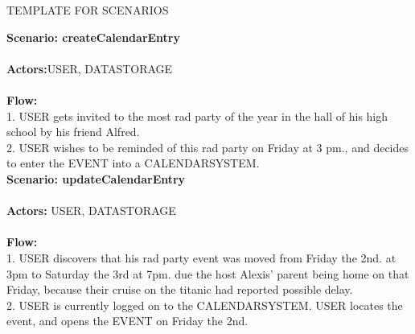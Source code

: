 TEMPLATE FOR SCENARIOS

\textbf{Scenario: createCalendarEntry}\\
\HRule \\[0.4cm]
\textbf{Actors:}USER, DATASTORAGE\\
\HRule \\[0.4cm]
\textbf{Flow:} \\
1. USER gets invited to the most rad party of the year in the hall of his high school by his friend Alfred.\\
2. USER wishes to be reminded of this rad party on Friday at 3 pm., and decides to enter the EVENT into a CALENDARSYSTEM.\\
\textbf{Scenario: updateCalendarEntry}\\
\HRule \\[0.4cm]
\textbf{Actors:} USER, DATASTORAGE\\
\HRule \\[0.4cm]
\textbf{Flow:}\\
1. USER discovers that his rad party event was moved from Friday the 2nd. at 3pm to Saturday the 3rd at 7pm. due the host Alexis' parent being home on that Friday, because their cruise on the titanic had reported possible delay.\\
2. USER is currently logged on to the CALENDARSYSTEM. USER locates the event, and opens the EVENT on Friday the 2nd.\\
\HRule \\[0.4cm]